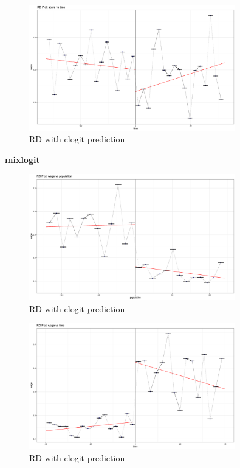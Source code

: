 \documentclass{article}
\begin{document}
\begin{figure}[H]
    \centering
    \includegraphics[width=0.8\textwidth]{figures/clogit_rd4.png}
    \caption{RD with clogit prediction}
    \label{fig:clogit_rd4}
\end{figure}

\textbf{mixlogit}

\begin{figure}[H]
    \centering
    \includegraphics[width=0.8\textwidth]{figures/mixlogit_rd1.png}
    \caption{RD with clogit prediction}
    \label{fig:mixlogit_rd1}
\end{figure}

\begin{figure}[H]
    \centering
    \includegraphics[width=0.8\textwidth]{figures/mixlogit_rd2.png}
    \caption{RD with clogit prediction}
    \label{fig:mixlogit_rd2}
\end{figure}
\end{document}
